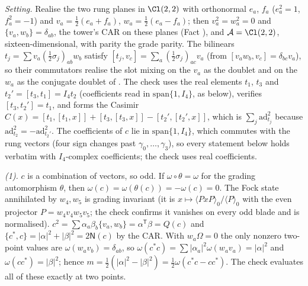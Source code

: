 \emph{Setting.} Realise the two rung planes in $\Cl(2,2)$ with orthonormal $e_{a}$, $f_{a}$ ($e_{a}^{2} = 1$, $f_{a}^{2} = -1$) and $v_{a} = \tfrac12(e_{a} + f_{a})$, $w_{a} = \tfrac12(e_{a} - f_{a})$; then $v_{a}^{2} = w_{a}^{2} = 0$ and $\{v_{a}, w_{b}\} = \delta_{ab}$, the tower's CAR on these planes (Fact ), and $\mathcal{A} = \Cl(2,2)$, sixteen-dimensional, with parity the grade parity. The bilinears $t_{j} = \sum v_{a}(\tfrac12\sigma_{j})_{ab}w_{b}$ satisfy $[t_{j}, v_{c}] = \sum_{a}(\tfrac12\sigma_{j})_{ac}v_{a}$ (from $[v_{a}w_{b}, v_{c}] = \delta_{bc}v_{a}$), so their commutators realise the slot mixing on the $v_{a}$ as the doublet and on the $w_{a}$ as the conjugate doublet of . The check uses the real elements $t_{1}$, $t_{3}$ and $t_{2}' = [t_{3}, t_{1}] = I_{4}t_{2}$ (coefficients read in $\mathrm{span}\{1, I_{4}\}$, as below), verifies $[t_{3}, t_{2}'] = t_{1}$, and forms the Casimir $C(x) = [t_{1},[t_{1},x]] + [t_{3},[t_{3},x]] - [t_{2}',[t_{2}',x]]$, which is $\sum_{j}\mathrm{ad}_{t_{j}}^{2}$ because $\mathrm{ad}_{t_{2}}^{2} = -\mathrm{ad}_{t_{2}'}^{2}$. The coefficients of $c$ lie in $\mathrm{span}\{1, I_{4}\}$, which commutes with the rung vectors (four sign changes past $\gamma_{0}, \ldots, \gamma_{3}$), so every statement below holds verbatim with $I_{4}$-complex coefficients; the check uses real coefficients.

\emph{(1).} $c$ is a combination of vectors, so odd. If $\omega\circ\theta = \omega$ for the grading automorphism $\theta$, then $\omega(c) = \omega(\theta(c)) = -\omega(c) = 0$. The Fock state annihilated by $w_{4}, w_{5}$ is grading invariant (it is $x \mapsto \langle PxP\rangle_{0}/\langle P\rangle_{0}$ with the even projector $P = w_{4}v_{4}w_{5}v_{5}$; the check confirms it vanishes on every odd blade and is normalised). $c^{2} = \sum\alpha_{a}\beta_{b}\{v_{a}, w_{b}\} = \alpha^{\mathsf T}\beta = Q(c)$ and $\{c^{*}, c\} = |\alpha|^{2} + |\beta|^{2} = 2\mathsf{N}(c)$ by the CAR. With $w_{a}\Omega = 0$ the only nonzero two-point values are $\omega(w_{a}v_{b}) = \delta_{ab}$, so $\omega(c^{*}c) = \sum|\alpha_{a}|^{2}\omega(w_{a}v_{a}) = |\alpha|^{2}$ and $\omega(cc^{*}) = |\beta|^{2}$; hence $m = \tfrac12(|\alpha|^{2} - |\beta|^{2}) = \tfrac12\omega(c^{*}c - cc^{*})$. The check evaluates all of these exactly at two points.

